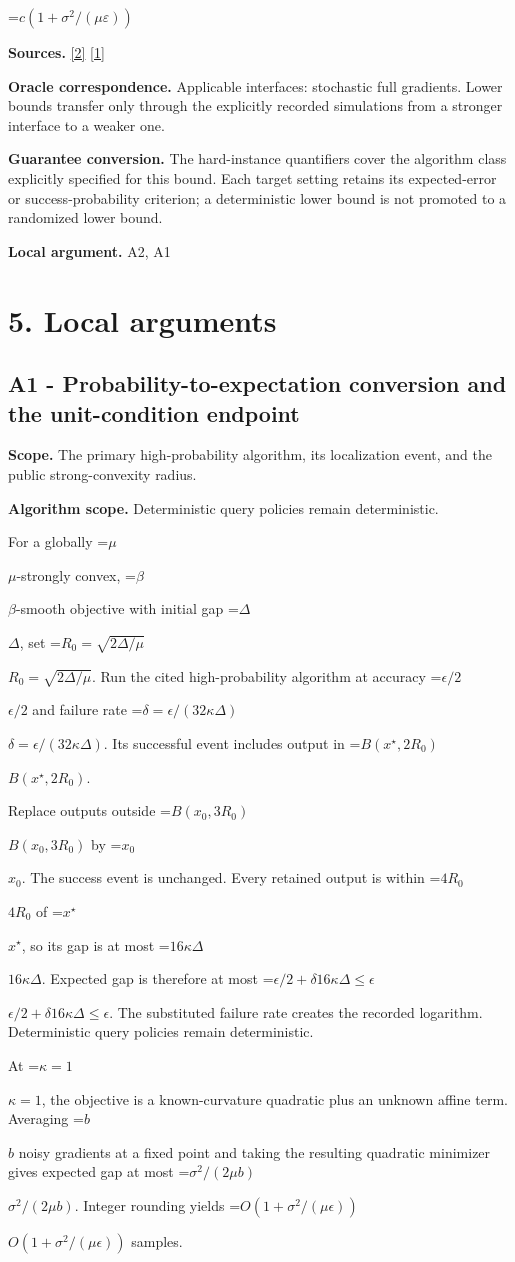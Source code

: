 \documentclass[10pt,a4paper]{article}
\newcommand{\AtlasMath}[1]{\par\begingroup\centering\setbox0=\hbox{$\displaystyle #1$}\ifdim\wd0>1.4\linewidth\typeout{ATLAS WIDE FORMULA: \the\wd0}\fi\ifdim\wd0>\linewidth\resizebox{\linewidth}{!}{\box0}\else\box0\fi\par\endgroup}
\newcommand{\AtlasInlineMath}[1]{\begingroup\setbox0=\hbox{$#1$}\ifdim\wd0>.4\linewidth\endgroup\AtlasMath{#1}\else\endgroup$#1$\fi}
\begin{document}
\AtlasMath{c(1+\sigma^2/(\mu\varepsilon))}
\textbf{Sources.} \href{https://arxiv.org/pdf/2609.10874}{[2]} \href{https://proceedings.mlr.press/v202/sadiev23a/sadiev23a.pdf}{[1]}

\textbf{Oracle correspondence.} Applicable interfaces: stochastic full gradients. Lower bounds transfer only through the explicitly recorded simulations from a stronger interface to a weaker one.

\textbf{Guarantee conversion.} The hard-instance quantifiers cover the algorithm class explicitly specified for this bound. Each target setting retains its expected-error or success-probability criterion; a deterministic lower bound is not promoted to a randomized lower bound.

\textbf{Local argument.} A2, A1

\section{5. Local arguments}
\subsection{A1 - Probability-to-expectation conversion and the unit-condition endpoint}
\textbf{Scope.} The primary high-probability algorithm, its localization event, and the public strong-convexity radius.

\textbf{Algorithm scope.} Deterministic query policies remain deterministic.

For a globally \AtlasInlineMath{\mu}-strongly convex, \AtlasInlineMath{\beta}-smooth objective with initial gap \AtlasInlineMath{\Delta}, set \AtlasInlineMath{R_0=\sqrt{2\Delta/\mu}}. Run the cited high-probability algorithm at accuracy \AtlasInlineMath{\epsilon/2} and failure rate \AtlasInlineMath{\delta=\epsilon/(32\kappa\Delta)}. Its successful event includes output in \AtlasInlineMath{B(x^\star,2R_0)}.

Replace outputs outside \AtlasInlineMath{B(x_0,3R_0)} by \AtlasInlineMath{x_0}. The success event is unchanged. Every retained output is within \AtlasInlineMath{4R_0} of \AtlasInlineMath{x^\star}, so its gap is at most \AtlasInlineMath{16\kappa\Delta}. Expected gap is therefore at most
\AtlasInlineMath{\epsilon/2+\delta16\kappa\Delta\le\epsilon}.
The substituted failure rate creates the recorded logarithm. Deterministic query policies remain deterministic.

At \AtlasInlineMath{\kappa=1}, the objective is a known-curvature quadratic plus an unknown affine term. Averaging \AtlasInlineMath{b} noisy gradients at a fixed point and taking the resulting quadratic minimizer gives expected gap at most \AtlasInlineMath{\sigma^2/(2\mu b)}. Integer rounding yields \AtlasInlineMath{O(1+\sigma^2/(\mu\epsilon))} samples.
\end{document}
